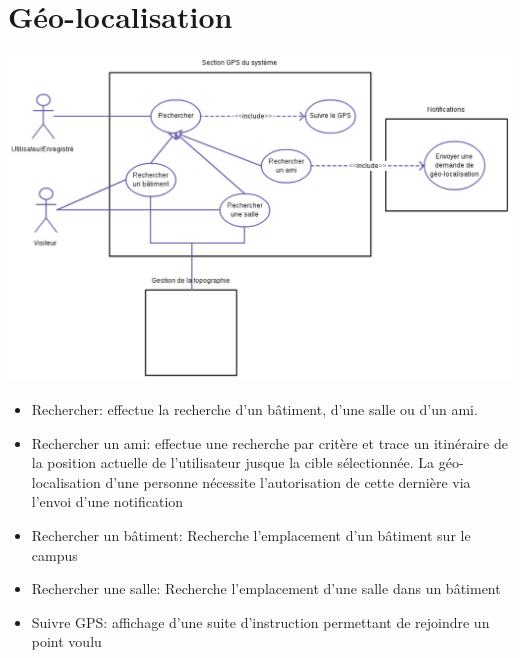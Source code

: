 \section{Géo-localisation}
\includegraphics[scale=0.9,angle=90]{cu/GPS.pdf}
\newpage
\begin{itemize}
\item Rechercher: effectue la recherche d’un bâtiment, d’une salle ou d’un ami.
\item Rechercher un ami: effectue une recherche par critère et trace un itinéraire de la position actuelle de l’utilisateur jusque la cible sélectionnée. La géo-localisation d’une personne nécessite l’autorisation de cette dernière via l’envoi d’une notification
\item Rechercher un bâtiment: Recherche l’emplacement d’un bâtiment sur le campus
\item Rechercher une salle: Recherche l’emplacement d’une salle dans un bâtiment
\item Suivre GPS: affichage d’une suite d’instruction permettant de rejoindre un point voulu
\end{itemize}
\newpage


